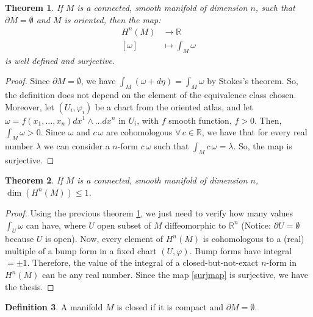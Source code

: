 \documentclass[a4paper,11pt,titlepage, article, oneside]{memoir}
\numberwithin{equation}{section}
\newtheorem{theorem}{Theorem}[section]
\theoremstyle{definition}
\newtheorem{definition}[theorem]{Definition}
\theoremstyle{remark}
\newcommand{\rfield}{\mathbb{R}}
\begin{document}
\begin{theorem} \label{surjintegral}
If $M$ is a connected, smooth manifold of dimension $n$, such that $\partial M = \emptyset$ and $M$ is oriented, then the map:
\begin{align} \label{surjmap}
H^n(M) &\rightarrow \rfield \\
[\omega] &\mapsto \int_M \omega \nonumber
\end{align}
is well defined and surjective.
\end{theorem}
\begin{proof}
Since $\partial M = \emptyset$, we have $\int_M (\omega + d \eta) = \int_M \omega$ by Stokes's theorem. So, the definition does not depend on the element of the equivalence class chosen. Moreover, let $(U_i, \varphi_i)$  be a chart from the oriented atlas, and let $\omega=f(x_1, \ldots, x_n) dx^1 \wedge \ldots dx^n$ in $U_i$, with $f$ smooth function, $f > 0$. Then, $\int_M \omega > 0$. Since $\omega$ and $c \, \omega$ are cohomologous $\forall \, c \in \rfield$, we have that for every real number $\lambda$ we can consider a $n$-form $c\,  \omega$ such that $\int_M c\, \omega = \lambda$. So, the map is surjective.
\end{proof}

\begin{theorem}
If $M$ is a connected, smooth manifold of dimension $n$, $\dim \left( H^n(M) \right) \le 1$.
\end{theorem}
\begin{proof}
Using the previous theorem \ref{surjintegral}, we just need to verify how many values $\int_U \omega$ can have, where $U$ open subset of $M$ diffeomorphic to $\rfield^n$ (Notice: $\partial U = \emptyset$ because $U$ is open). Now, every element of $H^n(M)$ is cohomologous to a (real) multiple of  a bump form in a fixed chart $(U, \varphi)$. Bump forms have integral $ =\pm 1$. Therefore, the value of the integral of a closed-but-not-exact $n$-form in $H^n(M)$ can be any real number. Since the map \eqref{surjmap} is surjective, we have the thesis.
\end{proof}

\begin{definition} \label{closedman}
A manifold $M$ is closed if it is compact and $\partial M = \emptyset$.
\end{definition}
\end{document}
